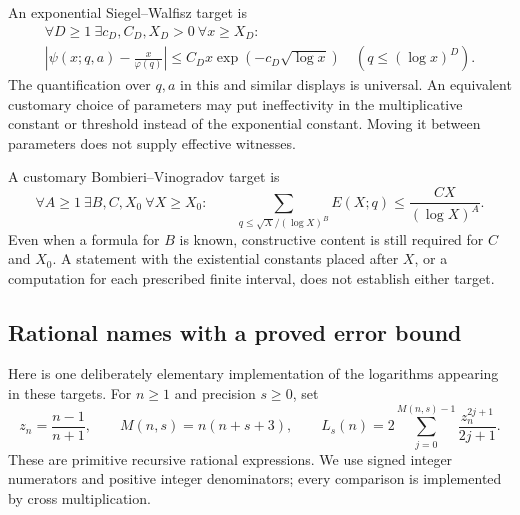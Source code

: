 An exponential Siegel--Walfisz target is
\begin{equation}
 \begin{gathered}
 \forall D\geq1\ \exists c_D,C_D,X_D>0\ \forall x\geq X_D:\\
 \left|\psi(x;q,a)-\frac{x}{\varphi(q)}\right|
 \leq C_Dx\exp(-c_D\sqrt{\log x})
 \quad(q\leq(\log x)^D).
 \end{gathered}
 \label{eq:sw-analytic-target}
\end{equation}
The quantification over $q,a$ in this and similar displays is universal.
An equivalent customary choice of parameters may put ineffectivity in
the multiplicative constant or threshold instead of the exponential
constant. Moving it between parameters does not supply effective
witnesses.

A customary Bombieri--Vinogradov target is
\begin{equation}
 \forall A\geq1\ \exists B,C,X_0\ \forall X\geq X_0:
 \qquad
 \sum_{q\leq \sqrt X/(\log X)^B}E(X;q)
 \leq \frac{CX}{(\log X)^A}.
 \label{eq:bv-analytic-target}
\end{equation}
Even when a formula for $B$ is known, constructive content is still
required for $C$ and $X_0$. A statement with the existential constants
placed after $X$, or a computation for each prescribed finite interval,
does not establish either target.

\subsection{Rational names with a proved error bound}

Here is one deliberately elementary implementation of the logarithms
appearing in these targets. For $n\geq1$ and precision $s\geq0$, set
\[
 z_n=\frac{n-1}{n+1},\qquad M(n,s)=n(n+s+3),\qquad
 L_s(n)=2\sum_{j=0}^{M(n,s)-1}\frac{z_n^{2j+1}}{2j+1}.
\]
These are primitive recursive rational expressions. We use signed
integer numerators and positive integer denominators; every comparison
is implemented by cross multiplication.

